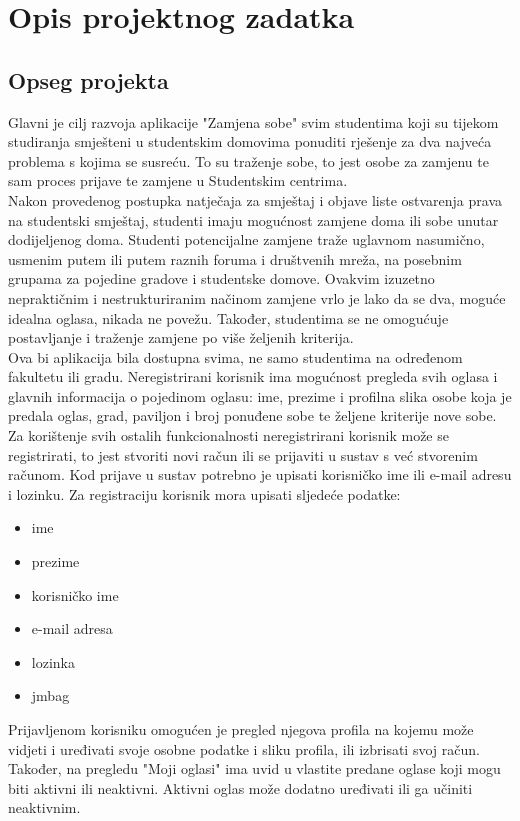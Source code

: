 \chapter{Opis projektnog zadatka}
		
		\section{Opseg projekta}
		
		Glavni je cilj razvoja aplikacije "Zamjena sobe" svim studentima koji su tijekom studiranja smješteni u studentskim domovima ponuditi rješenje za dva najveća problema s kojima se susreću. To su traženje sobe, to jest osobe za zamjenu te sam proces prijave te zamjene u Studentskim centrima.\\
		Nakon provedenog postupka natječaja za smještaj i objave liste ostvarenja prava na studentski smještaj, studenti imaju mogućnost zamjene doma ili sobe unutar dodijeljenog doma. 
		Studenti potencijalne zamjene traže uglavnom nasumično, usmenim putem ili putem raznih foruma i društvenih mreža, na posebnim grupama za pojedine gradove i studentske domove. Ovakvim izuzetno nepraktičnim i nestrukturiranim načinom zamjene vrlo je lako da se dva, moguće idealna oglasa, nikada ne povežu. Također, studentima se ne omogućuje postavljanje i traženje zamjene po više željenih kriterija.\\ 
		Ova bi aplikacija bila dostupna svima, ne samo studentima na određenom fakultetu ili gradu. Neregistrirani korisnik ima mogućnost pregleda svih oglasa i glavnih informacija o pojedinom oglasu: ime, prezime i profilna slika osobe koja je predala oglas, grad, paviljon i broj ponuđene sobe te željene kriterije nove sobe. Za korištenje svih ostalih funkcionalnosti neregistrirani korisnik može se registrirati, to jest stvoriti novi račun ili se prijaviti u sustav s već stvorenim računom. Kod prijave u sustav potrebno je upisati korisničko ime ili e-mail adresu i lozinku. Za registraciju korisnik mora upisati sljedeće podatke: 
		\begin{itemize}
			\item ime
			\item prezime
			\item korisničko ime
			\item e-mail adresa
			\item lozinka
			\item jmbag
		\end{itemize} 
		Prijavljenom korisniku omogućen je pregled njegova profila na kojemu može vidjeti i uređivati svoje osobne podatke i sliku profila, ili izbrisati svoj račun. Također, na pregledu "Moji oglasi" ima uvid u vlastite predane oglase koji mogu biti aktivni ili neaktivni. Aktivni oglas može dodatno uređivati ili ga učiniti neaktivnim.\\
